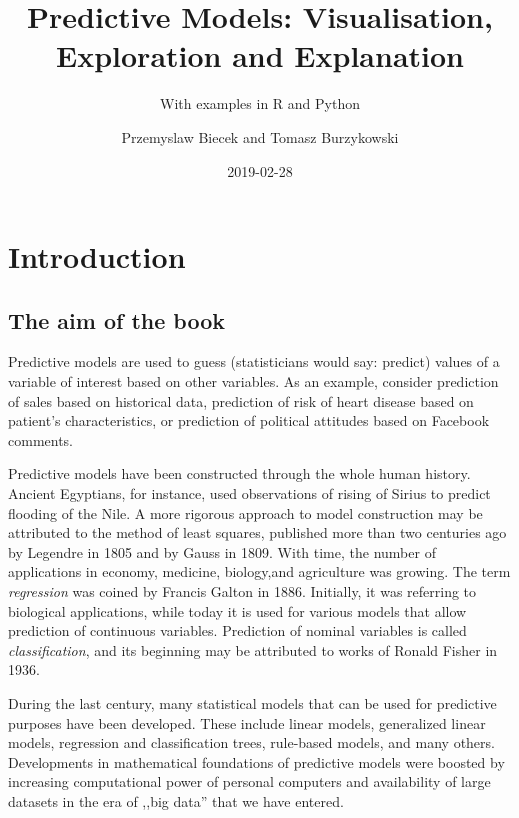 \documentclass[]{krantz}
\title{Predictive Models: Visualisation, Exploration and Explanation}
\subtitle{With examples in R and Python}
\author{Przemyslaw Biecek and Tomasz Burzykowski}
\date{2019-02-28}
\theoremstyle{definition}
\theoremstyle{definition}
\theoremstyle{definition}
\theoremstyle{remark}
\begin{document}
\maketitle

{
\hypersetup{linkcolor=black}
\setcounter{tocdepth}{2}
\tableofcontents
}
\listoftables
\listoffigures
\hypertarget{introduction}{%
\section{Introduction}\label{introduction}}

\hypertarget{the-aim-of-the-book}{%
\subsection{The aim of the book}\label{the-aim-of-the-book}}

Predictive models are used to guess (statisticians would say: predict)
values of a variable of interest based on other variables. As an
example, consider prediction of sales based on historical data,
prediction of risk of heart disease based on patient's characteristics,
or prediction of political attitudes based on Facebook comments.

Predictive models have been constructed through the whole human history.
Ancient Egyptians, for instance, used observations of rising of Sirius
to predict flooding of the Nile. A more rigorous approach to model
construction may be attributed to the method of least squares, published
more than two centuries ago by Legendre in 1805 and by Gauss in 1809.
With time, the number of applications in economy, medicine, biology,and
agriculture was growing. The term \emph{regression} was coined by
Francis Galton in 1886. Initially, it was referring to biological
applications, while today it is used for various models that allow
prediction of continuous variables. Prediction of nominal variables is
called \emph{classification}, and its beginning may be attributed to
works of Ronald Fisher in 1936.

During the last century, many statistical models that can be used for
predictive purposes have been developed. These include linear models,
generalized linear models, regression and classification trees,
rule-based models, and many others. Developments in mathematical
foundations of predictive models were boosted by increasing
computational power of personal computers and availability of large
datasets in the era of ,,big data'' that we have entered.
\end{document}
